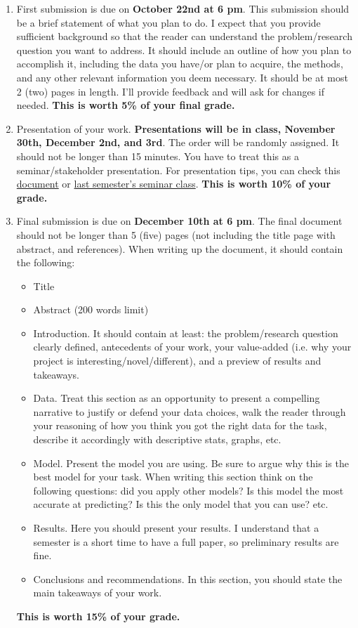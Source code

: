 \documentclass[12pt,onecolumn]{article}
\begin{document}
\begin{enumerate}
\item First submission is due on {\bf October 22nd at 6 pm}. This submission should be a brief statement of what you plan to do.  I expect that you provide sufficient background so that the reader can understand the problem/research question you want to address. It should include an outline of how you plan to accomplish it, including the data you have/or plan to acquire, the methods, and any other relevant information you deem necessary.
It should be at most 2 (two) pages in length. I'll provide feedback and will ask for changes if needed. {\bf This is worth 5\% of your final grade.}

\item Presentation of your work. {\bf Presentations will be in class, November 30th, December 2nd, and 3rd}. The order will be randomly assigned. It should not be longer than 15 minutes. You have to treat this as a seminar/stakeholder presentation. For presentation tips, you can check this \href{https://ignaciomsarmiento.github.io/teaching/seminar/Tips_Presentation_PEG.pdf}{document} or  \href{https://ignaciomsarmiento.github.io/teaching/Tesis.html}{last semester's seminar class}. {\bf This is worth 10\% of your grade.}


\item Final  submission is due on {\bf December 10th at 6 pm}. The final document should not be longer than 5 (five) pages (not including the title page with abstract, and references). When writing up the document, it should contain the following:
\begin{itemize}
  \item Title
  \item Abstract (200 words limit)
  \item Introduction. It should contain at least: the problem/research question clearly defined,  antecedents of your work, your value-added (i.e. why your project is interesting/novel/different), and a preview of  results and takeaways.
  \item Data. Treat this section as an opportunity to present a compelling narrative to justify or defend your data choices, walk the reader through your reasoning of how you think you got the right data for the task, describe it accordingly with descriptive stats, graphs, etc.
  \item Model. Present the model you are using.  Be sure to argue why this is the best model for your task. When writing this section think on the following questions: did you apply other models? Is this model the most accurate at predicting?  Is this the only model that you can use? etc. 
  \item Results. Here you should present your results. I understand that a semester is a short time to have a full paper, so preliminary results are fine. 
  \item Conclusions and recommendations. In this section, you should state the main takeaways of your work.
\end{itemize}
{\bf This is worth 15\% of your grade.}
\end{enumerate}
\end{document}
